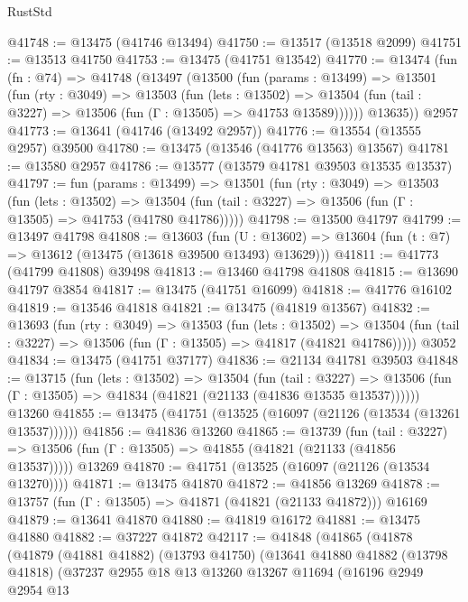 \begin{lexlean}{RustStd}
\begin{coremodule}
@41748 := @13475 (@41746 @13494)
@41750 := @13517 (@13518 @2099)
@41751 := @13513 @41750
@41753 := @13475 (@41751 @13542)
@41770 := @13474
    (fun (fn : @74) =>
    @41748
      (@13497
        (@13500
          (fun (params : @13499) =>
          @13501
            (fun (rty : @3049) =>
            @13503
              (fun (lets : @13502) =>
              @13504 (fun (tail : @3227) => @13506 (fun (Γ : @13505) => @41753 @13589))))))
        @13635))
    @2957
@41773 := @13641 (@41746 (@13492 @2957))
@41776 := @13554 (@13555 @2957) @39500
@41780 := @13475 (@13546 (@41776 @13563) @13567)
@41781 := @13580 @2957
@41786 := @13577 (@13579 @41781 @39503 @13535 @13537)
@41797 := fun (params : @13499) =>
  @13501
    (fun (rty : @3049) =>
    @13503
      (fun (lets : @13502) =>
      @13504 (fun (tail : @3227) => @13506 (fun (Γ : @13505) => @41753 (@41780 @41786)))))
@41798 := @13500 @41797
@41799 := @13497 @41798
@41808 := @13603
    (fun (U : @13602) => @13604 (fun (t : @7) => @13612 (@13475 (@13618 @39500 @13493) @13629)))
@41811 := @41773 (@41799 @41808) @39498
@41813 := @13460 @41798 @41808
@41815 := @13690 @41797 @3854
@41817 := @13475 (@41751 @16099)
@41818 := @41776 @16102
@41819 := @13546 @41818
@41821 := @13475 (@41819 @13567)
@41832 := @13693
    (fun (rty : @3049) =>
    @13503
      (fun (lets : @13502) =>
      @13504 (fun (tail : @3227) => @13506 (fun (Γ : @13505) => @41817 (@41821 @41786)))))
    @3052
@41834 := @13475 (@41751 @37177)
@41836 := @21134 @41781 @39503
@41848 := @13715
    (fun (lets : @13502) =>
    @13504
      (fun (tail : @3227) =>
      @13506 (fun (Γ : @13505) => @41834 (@41821 (@21133 (@41836 @13535 @13537))))))
    @13260
@41855 := @13475 (@41751 (@13525 (@16097 (@21126 (@13534 (@13261 @13537))))))
@41856 := @41836 @13260
@41865 := @13739
    (fun (tail : @3227) => @13506 (fun (Γ : @13505) => @41855 (@41821 (@21133 (@41856 @13537)))))
    @13269
@41870 := @41751 (@13525 (@16097 (@21126 (@13534 @13270))))
@41871 := @13475 @41870
@41872 := @41856 @13269
@41878 := @13757 (fun (Γ : @13505) => @41871 (@41821 (@21133 @41872))) @16169
@41879 := @13641 @41870
@41880 := @41819 @16172
@41881 := @13475 @41880
@41882 := @37227 @41872
@42117 := @41848
    (@41865
      (@41878
        (@41879
          (@41881 @41882)
          (@13793 @41750)
          (@13641
            @41880
            @41882
            (@13798 @41818)
            (@37237
              @2955
              @18
              @13
              @13260
              @13267
              @11694
              (@16196
                @2949
                @2954
                @13

\end{coremodule}
\end{lexlean}
